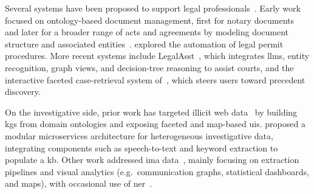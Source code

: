 


Several systems have been proposed to support legal professionals~\cite{amato2008,buey2016,breit_legal_permits_2020,HAN2024121052legalasst,human-ai-system-legal-precedent-search-china}. Early work focused on ontology-based document management, first for notary documents~\cite{amato2008} and later for a broader range of acts and agreements by modeling document structure and associated entities~\cite{buey2016}. \textcite{breit_legal_permits_2020} explored the automation of legal permit procedures. More recent systems include LegalAsst~\cite{HAN2024121052legalasst}, which integrates \acp{llm}, entity recognition, graph views, and decision-tree reasoning to assist courts, and the interactive faceted case-retrieval system of~\textcite{human-ai-system-legal-precedent-search-china}, which steers users toward precedent discovery.

On the investigative side, prior work has targeted illicit web data~\cite{kejriwal2017searchengine,kejriwal2018} by building \acp{kg} from domain ontologies and exposing faceted and map-based \acp{ui}. \textcite{P_rez_2021} proposed a modular microservices architecture for heterogeneous investigative data, integrating components such as speech-to-text and keyword extraction to populate a \ac{kb}. Other work addressed \acl{ima} data~\cite{kaushik2022forensic,pirzada2024framework,subbulakshmi2024forensic,Sonakshi_whatsapp_group_2025}, mainly focusing on extraction pipelines and visual analytics (e.g.\ communication graphs, statistical dashboards, and maps), with occasional use of \ac{ner}~\cite{subbulakshmi2024forensic}.

